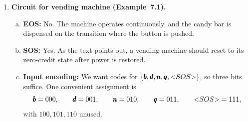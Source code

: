 \begin{enumerate}[{7.}1.]
\begin{enumerate}[(a)]
  \item \textbf{Moore sextuple:}  A Moore machine cannot use the same three
  states, because under Definition~7.17 the symbol printed after reading the
  first input is the output attached to the \emph{destination} state.  A
  correct Moore machine is
  \[
    A=\langle\{\pmb{a},\pmb{b}\},\{\pmb{a},\pmb{b},\pmb{x}\},Q,q_0,\delta',\eta\rangle,
  \]
  where
  \[
    Q=\{q_0,q_{x,a},q_{x,b},q_{a,a},q_{a,b},q_{b,a},q_{b,b}\}.
  \]
  Here the first component records the symbol to be printed \emph{now}, and the
  second component records the most recent input symbol for the next step.  The
  output function is
  \[
    \eta(q_0)=\pmb{x},\qquad
    \eta(q_{x,a})=\eta(q_{x,b})=\pmb{x},
  \]
  \[
    \eta(q_{a,a})=\eta(q_{a,b})=\pmb{a},\qquad
    \eta(q_{b,a})=\eta(q_{b,b})=\pmb{b}.
  \]
  The transition function is
  \[
    \delta'(q_0,\pmb{a})=q_{x,a},\qquad
    \delta'(q_0,\pmb{b})=q_{x,b},
  \]
  and, for $u\in\{\pmb{x},\pmb{a},\pmb{b}\}$ and
  $v,\sigma\in\{\pmb{a},\pmb{b}\}$,
  \[
    \delta'(q_{u,v},\sigma)=q_{v,\sigma}.
  \]
  Thus the first output is $\pmb{x}$, and each later output is the previous
  input symbol.

  \item \textbf{Moore machine diagram:}  The diagram is the graph of the
  sextuple in part~(c): the start state is $q_0/\pmb{x}$; it goes to
  $q_{x,a}/\pmb{x}$ on input $\pmb{a}$ and to $q_{x,b}/\pmb{x}$ on input
  $\pmb{b}$; and every state $q_{u,v}$ has arrows
  \[
    q_{u,v}\xrightarrow{\pmb{a}}q_{v,\pmb{a}},\qquad
    q_{u,v}\xrightarrow{\pmb{b}}q_{v,\pmb{b}}.
  \]
\end{enumerate}

\item \textbf{Circuit for vending machine (Example~7.1).}

\begin{enumerate}[(a)]
  \item \textbf{EOS:} No.  The machine operates continuously, and the candy bar is
  dispensed on the transition where the button is pushed.

  \item \textbf{SOS:} Yes.  As the text points out, a vending machine should reset
  to its zero-credit state after power is restored.

  \item \textbf{Input encoding:} We want codes for
  $\{\pmb{b},\pmb{d},\pmb{n},\pmb{q},\text{\textless}SOS\text{\textgreater}\}$, so three bits suffice.
  One convenient assignment is
  \[
    \pmb{b}=000,\qquad \pmb{d}=001,\qquad \pmb{n}=010,\qquad
    \pmb{q}=011,\qquad \text{\textless}SOS\text{\textgreater}=111,
  \]
  with $100,101,110$ unused.


\end{enumerate}
\end{enumerate}
